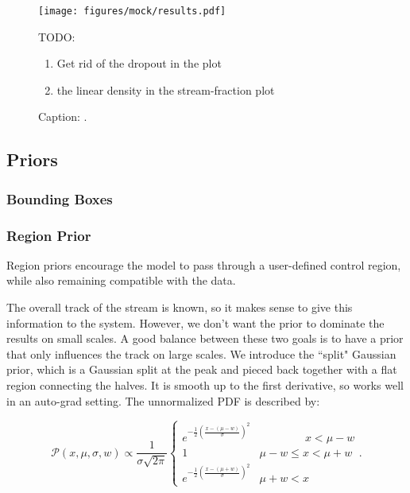 \documentclass[twocolumn]{aastex631}
\newcommand{\mcal}[1]{\mathcal{#1}}
\newcommand{\Exp}[1]{e^{#1}}
\newcommand{\pdf}{\mcal{P}}
\begin{document}
        \begin{figure}
            \centering
            \texttt{[image: figures/mock/results.pdf]}
            \caption{Caption: .}
            TODO:
            \begin{enumerate}
                \item Get rid of the dropout in the plot
                \item the linear density in the stream-fraction plot
            \end{enumerate}
            \label{fig:mock_data_result}
        \end{figure}

    \subsection{Priors} \label{sub:priors}

        \subsubsection{Bounding Boxes}


        \subsubsection{Region Prior} \label{sub:track_region_prior}

            Region priors encourage the model to pass through a user-defined control region, while also remaining compatible with the data.

            The overall track of the stream is known, so it makes sense to give this information to the system. However, we don't want the prior to dominate the results on small scales. A good balance between these two goals is to have a prior that only influences the track on large scales.
            We introduce the ``split" Gaussian prior, which is a Gaussian split at the peak and pieced back together with a flat region connecting the halves. 
            It is smooth up to the first derivative, so works well in an auto-grad setting.
            The unnormalized PDF is described by:
            \begin{small}
            \begin{equation}
                \pdf(x,\mu,\sigma,w) \propto  \frac{1}{\sigma \sqrt{2 \pi}} \begin{cases} 
                   \Exp{-\frac{1}{2}\left(\frac{x-(\mu-w)}{\sigma}\right)^2} & \phantom{\mu - w <}\ x < \mu - w \\
                    1 & \mu - w \leq x < \mu + w \\
                    \Exp{-\frac{1}{2}\left(\frac{x-(\mu+w)}{\sigma}\right)^2} & \mu + w < x
                \end{cases}.
            \end{equation}\end{small}
    
\end{document}
